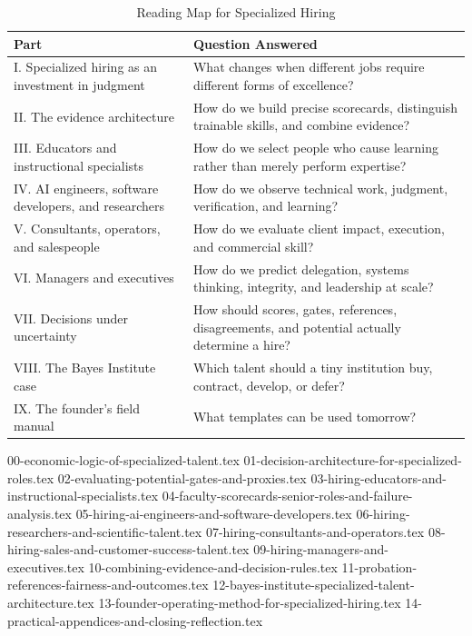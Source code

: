 \begin{table}[t]
\centering
\small
\caption{Reading Map for Specialized Hiring}
\label{tab:ch24_reading_map}
\begin{tabularx}{\textwidth}{p{4.2cm} X}
\toprule
\textbf{Part} & \textbf{Question Answered} \\
\midrule
I. Specialized hiring as an investment in judgment & What changes when different jobs require different forms of excellence? \\
II. The evidence architecture & How do we build precise scorecards, distinguish trainable skills, and combine evidence? \\
III. Educators and instructional specialists & How do we select people who cause learning rather than merely perform expertise? \\
IV. AI engineers, software developers, and researchers & How do we observe technical work, judgment, verification, and learning? \\
V. Consultants, operators, and salespeople & How do we evaluate client impact, execution, and commercial skill? \\
VI. Managers and executives & How do we predict delegation, systems thinking, integrity, and leadership at scale? \\
VII. Decisions under uncertainty & How should scores, gates, references, disagreements, and potential actually determine a hire? \\
VIII. The Bayes Institute case & Which talent should a tiny institution buy, contract, develop, or defer? \\
IX. The founder's field manual & What templates can be used tomorrow? \\
\bottomrule
\end{tabularx}
\end{table}

{00-economic-logic-of-specialized-talent.tex}
{01-decision-architecture-for-specialized-roles.tex}
{02-evaluating-potential-gates-and-proxies.tex}
{03-hiring-educators-and-instructional-specialists.tex}
{04-faculty-scorecards-senior-roles-and-failure-analysis.tex}
{05-hiring-ai-engineers-and-software-developers.tex}
{06-hiring-researchers-and-scientific-talent.tex}
{07-hiring-consultants-and-operators.tex}
{08-hiring-sales-and-customer-success-talent.tex}
{09-hiring-managers-and-executives.tex}
{10-combining-evidence-and-decision-rules.tex}
{11-probation-references-fairness-and-outcomes.tex}
{12-bayes-institute-specialized-talent-architecture.tex}
{13-founder-operating-method-for-specialized-hiring.tex}
{14-practical-appendices-and-closing-reflection.tex}
